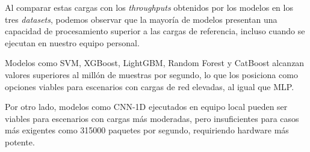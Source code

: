 Al comparar estas cargas con los \textit{throughputs} obtenidos por los modelos en los tres \textit{datasets}, podemos observar que la mayoría de modelos presentan una capacidad de procesamiento superior a las cargas de referencia, incluso cuando se ejecutan en nuestro equipo personal.

Modelos como SVM, XGBoost, LightGBM, Random Forest y CatBoost alcanzan valores superiores al millón de muestras por segundo, lo que los posiciona como opciones viables para escenarios con cargas de red elevadas, al igual que MLP.

Por otro lado, modelos como CNN-1D ejecutados en equipo local pueden ser viables para escenarios con cargas más moderadas, pero insuficientes para casos más exigentes como 315000 paquetes por segundo, requiriendo hardware más potente.
